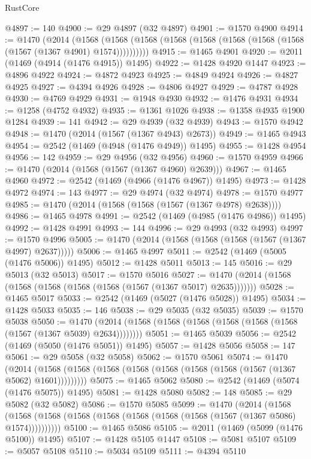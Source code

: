 \begin{lexlean}{RustCore}
\begin{coremodule}
@4897 := 140
@4900 := @29 @4897 (@32 @4897)
@4901 := @1570 @4900
@4914 := @1470
    (@2014
      (@1568 (@1568 (@1568 (@1568 (@1568 (@1568 (@1568 (@1568 (@1567 (@1367 @4901) @1574))))))))))
@4915 := @1465 @4901
@4920 := @2011 (@1469 (@4914 (@1476 @4915)) @1495)
@4922 := @1428 @4920 @1447
@4923 := @4896 @4922
@4924 := @4872 @4923
@4925 := @4849 @4924
@4926 := @4827 @4925
@4927 := @4394 @4926
@4928 := @4806 @4927
@4929 := @4787 @4928
@4930 := @4769 @4929
@4931 := @1948 @4930
@4932 := @1476 @4931
@4934 := @1258 (@4752 @4932)
@4935 := @1361 @1026
@4938 := @1358 @4935 @1900 @1284
@4939 := 141
@4942 := @29 @4939 (@32 @4939)
@4943 := @1570 @4942
@4948 := @1470 (@2014 (@1567 (@1367 @4943) @2673))
@4949 := @1465 @4943
@4954 := @2542 (@1469 (@4948 (@1476 @4949)) @1495)
@4955 := @1428 @4954
@4956 := 142
@4959 := @29 @4956 (@32 @4956)
@4960 := @1570 @4959
@4966 := @1470 (@2014 (@1568 (@1567 (@1367 @4960) @2639)))
@4967 := @1465 @4960
@4972 := @2542 (@1469 (@4966 (@1476 @4967)) @1495)
@4973 := @1428 @4972
@4974 := 143
@4977 := @29 @4974 (@32 @4974)
@4978 := @1570 @4977
@4985 := @1470 (@2014 (@1568 (@1568 (@1567 (@1367 @4978) @2638))))
@4986 := @1465 @4978
@4991 := @2542 (@1469 (@4985 (@1476 @4986)) @1495)
@4992 := @1428 @4991
@4993 := 144
@4996 := @29 @4993 (@32 @4993)
@4997 := @1570 @4996
@5005 := @1470 (@2014 (@1568 (@1568 (@1568 (@1567 (@1367 @4997) @2637)))))
@5006 := @1465 @4997
@5011 := @2542 (@1469 (@5005 (@1476 @5006)) @1495)
@5012 := @1428 @5011
@5013 := 145
@5016 := @29 @5013 (@32 @5013)
@5017 := @1570 @5016
@5027 := @1470 (@2014 (@1568 (@1568 (@1568 (@1568 (@1568 (@1567 (@1367 @5017) @2635)))))))
@5028 := @1465 @5017
@5033 := @2542 (@1469 (@5027 (@1476 @5028)) @1495)
@5034 := @1428 @5033
@5035 := 146
@5038 := @29 @5035 (@32 @5035)
@5039 := @1570 @5038
@5050 := @1470 (@2014 (@1568 (@1568 (@1568 (@1568 (@1568 (@1568 (@1567 (@1367 @5039) @2634))))))))
@5051 := @1465 @5039
@5056 := @2542 (@1469 (@5050 (@1476 @5051)) @1495)
@5057 := @1428 @5056
@5058 := 147
@5061 := @29 @5058 (@32 @5058)
@5062 := @1570 @5061
@5074 := @1470
    (@2014 (@1568 (@1568 (@1568 (@1568 (@1568 (@1568 (@1568 (@1567 (@1367 @5062) @1601)))))))))
@5075 := @1465 @5062
@5080 := @2542 (@1469 (@5074 (@1476 @5075)) @1495)
@5081 := @1428 @5080
@5082 := 148
@5085 := @29 @5082 (@32 @5082)
@5086 := @1570 @5085
@5099 := @1470
    (@2014
      (@1568 (@1568 (@1568 (@1568 (@1568 (@1568 (@1568 (@1568 (@1567 (@1367 @5086) @1574))))))))))
@5100 := @1465 @5086
@5105 := @2011 (@1469 (@5099 (@1476 @5100)) @1495)
@5107 := @1428 @5105 @1447
@5108 := @5081 @5107
@5109 := @5057 @5108
@5110 := @5034 @5109
@5111 := @4394 @5110

\end{coremodule}
\end{lexlean}
